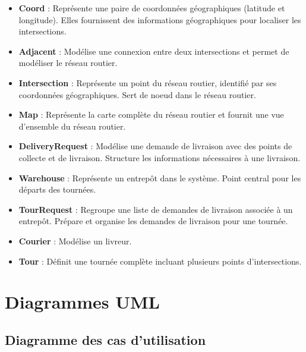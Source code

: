 \documentclass[a4paper]{article}
\begin{document}
\begin{itemize}
    \item \textbf{Coord} : Représente une paire de coordonnées géographiques (latitude et longitude). Elles fournissent des informations géographiques pour localiser les intersections.
    \item \textbf{Adjacent} : Modélise une connexion entre deux intersections et permet de modéliser le réseau routier.
    \item \textbf{Intersection} : Représente un point du réseau routier, identifié par ses coordonnées géographiques. Sert de noeud dans le réseau routier.
    \item \textbf{Map} : Représente la carte complète du réseau routier et fournit une vue d’ensemble du réseau routier.
    \item \textbf{DeliveryRequest} : Modélise une demande de livraison avec des points de collecte et de livraison. Structure les informations nécessaires à une livraison.
    \item \textbf{Warehouse} : Représente un entrepôt dans le système. Point central pour les départs des tournées.
    \item \textbf{TourRequest} : Regroupe une liste de demandes de livraison associée à un entrepôt. Prépare et organise les demandes de livraison pour une tournée.
    \item \textbf{Courier} : Modélise un livreur.
    \item \textbf{Tour} : Définit une tournée complète incluant plusieurs points d’intersections.   
\end{itemize}

\section{Diagrammes UML}

\subsection{Diagramme des cas d'utilisation}
\end{document}

